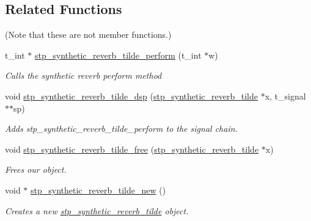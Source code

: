 \subsection*{Related Functions}
(Note that these are not member functions.) \begin{DoxyCompactItemize}
\item 
t\+\_\+int $\ast$ \hyperlink{structstp__synthetic__reverb__tilde_ab35deab6d15a334c87f6781f899f149b}{stp\+\_\+synthetic\+\_\+reverb\+\_\+tilde\+\_\+perform} (t\+\_\+int $\ast$w)
\begin{DoxyCompactList}\small\item\em Calls the synthetic reverb perform method ~\newline
 \end{DoxyCompactList}\item 
void \hyperlink{structstp__synthetic__reverb__tilde_ad3570131f19c433914c0326e21812175}{stp\+\_\+synthetic\+\_\+reverb\+\_\+tilde\+\_\+dsp} (\hyperlink{structstp__synthetic__reverb__tilde}{stp\+\_\+synthetic\+\_\+reverb\+\_\+tilde} $\ast$x, t\+\_\+signal $\ast$$\ast$sp)
\begin{DoxyCompactList}\small\item\em Adds stp\+\_\+synthetic\+\_\+reverb\+\_\+tilde\+\_\+perform to the signal chain. ~\newline
 \end{DoxyCompactList}\item 
void \hyperlink{structstp__synthetic__reverb__tilde_a52b8ab8409d61791f21ced09605a04ff}{stp\+\_\+synthetic\+\_\+reverb\+\_\+tilde\+\_\+free} (\hyperlink{structstp__synthetic__reverb__tilde}{stp\+\_\+synthetic\+\_\+reverb\+\_\+tilde} $\ast$x)
\begin{DoxyCompactList}\small\item\em Frees our object. ~\newline
 \end{DoxyCompactList}\item 
\mbox{\label{structstp__synthetic__reverb__tilde_af12805b17cd05b5ed1143782fbede971}} 
void $\ast$ \hyperlink{structstp__synthetic__reverb__tilde_af12805b17cd05b5ed1143782fbede971}{stp\+\_\+synthetic\+\_\+reverb\+\_\+tilde\+\_\+new} ()
\begin{DoxyCompactList}\small\item\em Creates a new \hyperlink{structstp__synthetic__reverb__tilde}{stp\+\_\+synthetic\+\_\+reverb\+\_\+tilde} object.~\newline

\end{DoxyCompactList}$$
\end{DoxyCompactItemize}
